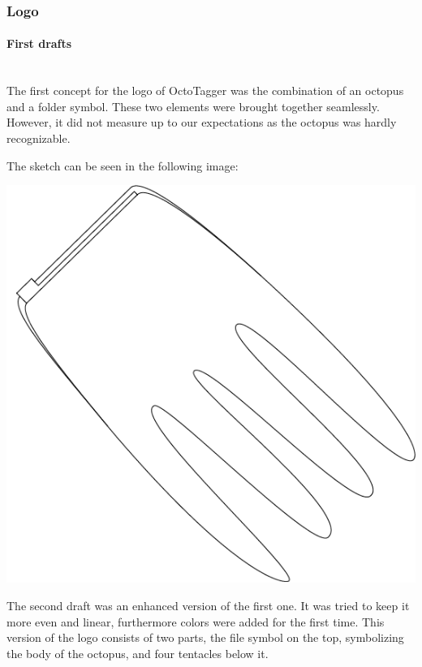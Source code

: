 \subsubsection{Logo}

\paragraph{First drafts} \hspace{0pt} \\

The first concept for the logo of OctoTagger was the combination of an octopus and a folder symbol. These two elements were brought together seamlessly. However, it did not measure up to our expectations as the octopus was hardly recognizable. 

The sketch can be seen in the following image:

\begin{center}
\includegraphics[scale=0.30]{images/logo_v01.png}
\end{center}

The second draft was an enhanced version of the first one. It was tried to keep it more even and linear, furthermore colors were added for the first time. This version of the logo consists of two parts, the file symbol on the top, symbolizing the body of the octopus, and four tentacles below it.

